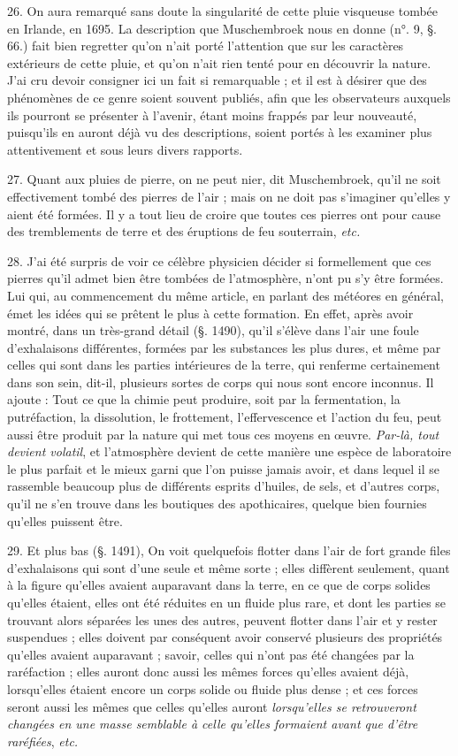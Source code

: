 \documentclass[a4paper, 11pt, oneside, polutonikogreek, french]{article}
\begin{document}
26. On aura remarqué sans doute la singularité de cette pluie visqueuse tombée en Irlande, en 1695. La description que Muschembroek nous en donne (n°. 9, §. 66.) fait bien regretter qu'on n'ait porté l'attention que sur les caractères extérieurs de cette pluie, et qu'on n'ait rien tenté pour en découvrir la nature. J'ai cru devoir consigner ici un fait si remarquable ; et il est à désirer que des phénomènes de ce genre soient souvent publiés, afin que les observateurs auxquels ils pourront se présenter à l'avenir, étant moins frappés par leur nouveauté, puisqu'ils en auront déjà vu des descriptions, soient portés à les examiner plus attentivement et sous leurs divers rapports.

27. Quant aux pluies de pierre, \og on ne peut nier, dit Muschembroek, qu'il ne soit effectivement tombé des pierres de l'air ; mais on ne doit pas s'imaginer qu'elles y aient été formées. Il y a tout lieu de croire que toutes ces pierres ont pour cause des tremblements de terre et des éruptions de feu souterrain, \emph{etc.} \fg

28. J'ai été surpris de voir ce célèbre physicien décider si formellement que ces pierres qu'il admet bien être tombées de l'atmosphère, n'ont pu s'y être formées. Lui qui, au commencement du même article, en parlant des météores en général, émet les idées qui se prêtent le plus à cette formation. En effet, après avoir montré, dans un très-grand détail (§. 1490), qu'il s'élève dans l'air une foule d'exhalaisons différentes, formées par les substances les plus dures, et même par celles qui sont dans les parties intérieures de la terre, qui renferme certainement dans son sein, dit-il, plusieurs sortes de corps qui nous sont encore inconnus. Il ajoute : \og Tout ce que la chimie peut produire, soit par la fermentation, la putréfaction, la dissolution, le frottement, l'effervescence et l'action du feu, peut aussi être produit par la nature qui met tous ces moyens en œuvre. \emph{Par-là, tout devient volatil}, et l'atmosphère devient de cette manière une espèce de laboratoire le plus parfait et le mieux garni que l'on puisse jamais avoir, et dans lequel il se rassemble beaucoup plus de différents esprits d'huiles, de sels, et d'autres corps, qu'il ne s'en trouve dans les boutiques des apothicaires, quelque bien fournies qu'elles puissent être. \fg

29. Et plus bas (§. 1491), \og On voit quelquefois flotter dans l'air de fort grande files d'exhalaisons qui sont d'une seule et même sorte ; elles diffèrent seulement, quant à la figure qu'elles avaient auparavant dans la terre, en ce que de corps solides qu'elles étaient, elles ont été réduites en un fluide plus rare, et dont les parties se trouvant alors séparées les unes des autres, peuvent flotter dans l'air et y rester suspendues ; elles doivent par conséquent avoir conservé plusieurs des propriétés qu'elles avaient auparavant ; savoir, celles qui n'ont pas été changées par la raréfaction ; elles auront donc aussi les mêmes forces qu'elles avaient déjà, lorsqu'elles étaient encore un corps solide ou fluide plus dense ; et ces forces seront aussi les mêmes que celles qu'elles auront \emph{lorsqu'elles se retrouveront changées en une masse semblable à celle qu'elles formaient avant que d'être raréfiées}, \emph{etc.} \fg
\end{document}
